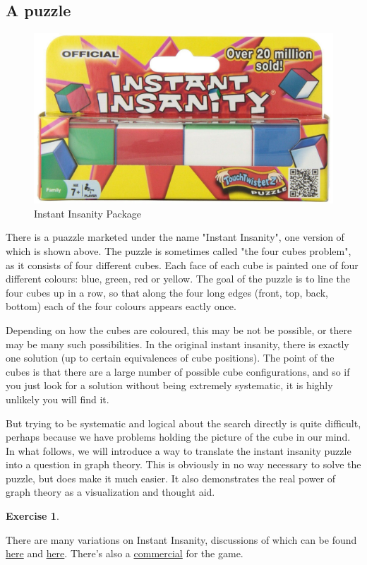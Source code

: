 \documentclass[10pt,]{book}
\theoremstyle{plain}
\theoremstyle{definition}
\theoremstyle{definition}
\theoremstyle{definition}
\theoremstyle{definition}
\newtheorem{exercise}[theorem]{Exercise}
\numberwithin{equation}{section}
\begin{document}
\subsection[{A puzzle}]{A puzzle}\label{subsection-10}
\leavevmode%
\begin{figure}
\centering
\includegraphics[width=0.8\linewidth]{images/InstantInsanityPackage.JPG}
\caption{Instant Insanity Package\label{figure-3}}
\end{figure}
\hypertarget{p-55}{}%
There is a puazzle marketed under the name "Instant Insanity", one version of which is shown above.  The puzzle is sometimes called "the four cubes problem", as it consists of four different cubes.   Each face of each cube is painted one of four different colours: blue, green, red or yellow. The goal of the puzzle is to line the four cubes up in a row, so that along the four long edges (front, top, back, bottom) each of the four colours appears eactly once.%
\par
\hypertarget{p-56}{}%
Depending on how the cubes are coloured, this may be not be possible, or there may be many such possibilities. In the original instant insanity, there is exactly one solution (up to certain equivalences of cube positions).  The point of the cubes is that there are a large number of possible cube configurations, and so if you just look for a solution without being extremely systematic, it is highly unlikely you will find it.%
\par
\hypertarget{p-57}{}%
But trying to be systematic and logical about the search directly is quite difficult, perhaps because we have problems holding the picture of the cube in our mind.  In what follows, we will introduce a way to translate the instant insanity puzzle into a question in graph theory.  This is obviously in no way necessary to solve the puzzle, but does make it much easier.  It also demonstrates the real power of graph theory as a visualization and thought aid.%
\begin{exercise}\label{exercise-2}
\end{exercise}
\hypertarget{p-59}{}%
There are many variations on Instant Insanity, discussions of which can be found \href{http://www.cs.brandeis.edu/\~storer/JimPuzzles/ZPAGES/zzzInstantInsanity.html}{here} and \href{http://www.jaapsch.net/puzzles/insanity.htm}{here}. There’s also a \href{https://www.youtube.com/watch?v=CQ2gHSKZBEw}{commercial} for the game.%
\typeout{************************************************}
\typeout{************************************************}
\end{document}
